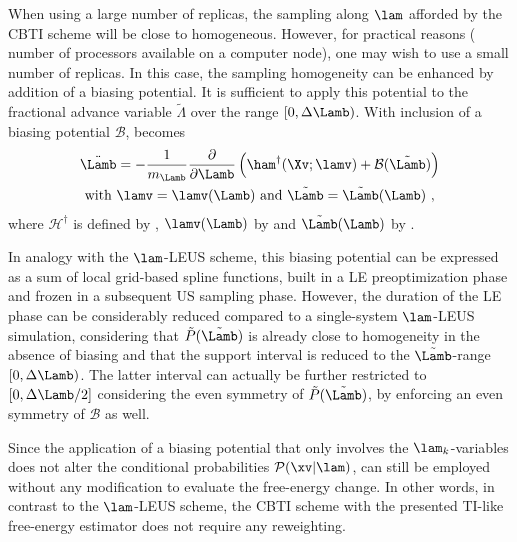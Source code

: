 When using a large number of replicas, the sampling along $\lam$ afforded by the CBTI scheme will be close to homogeneous. However, for practical reasons (\eg{} number of processors available on a computer node), one may wish to use a small number of replicas. In this case, the sampling homogeneity can be enhanced by addition of a biasing potential. It is sufficient to apply this potential to the fractional advance variable $\tilde{\Lambda}$ over the range $[0,\Delta \Lamb)$. With inclusion of a biasing potential $\mathcal{B}$,  becomes 
%
  \begin{multline}
  \label{eq:cb_big_lam_eq_mot_bias}
  \ddot{\Lamb} = -\frac {1} {m_{\Lamb}} \frac {\partial}{\partial \Lamb} \left ( \ham^\dagger(\Xv;\lamv)  
  + \mathcal{B}(\tilde{\Lamb}) \right) \\ \text{with} \  \lamv=\lamv(\Lamb)\ \text{and}\ \tilde{\Lamb}=\tilde{\Lamb}(\Lamb) \ ,
  \end{multline}
%
where $\mathcal{H}^{\dagger}$ is defined by , $\lamv(\Lamb)$ by  and $\tilde{\Lamb}(\Lamb)$ by . 


In analogy with the $\lam$-LEUS scheme\cite{BI14.1,BI14.2,BI15.1,BI15.2}, this biasing potential can be expressed as a sum of local grid-based spline functions, built in a LE preoptimization phase and frozen in a subsequent US sampling phase. However, the duration of the LE phase can be considerably reduced compared to a single-system $\lam$-LEUS simulation, considering that $\tilde{P}(\tilde{\Lamb})$ is already close to homogeneity in the absence of biasing and that the support interval is reduced to the $\tilde{\Lamb}$-range $[0,\Delta \Lamb)$. The latter interval can actually be further restricted to $[0,\Delta \Lamb / 2]$ considering the even symmetry of $\tilde{P}(\tilde{\Lamb})$, \ie{} by enforcing an even symmetry of $\mathcal{B}$ as well.

Since the application of a biasing potential that only involves the $\lam_k$-variables does not alter the 
conditional probabilities $\mathcal{P}(\xv|\lam)$,  
can still be employed without any modification to evaluate the free-energy change. In other words, 
in contrast to the $\lam$-LEUS scheme, the CBTI scheme with the presented TI-like free-energy estimator does not require any reweighting.
